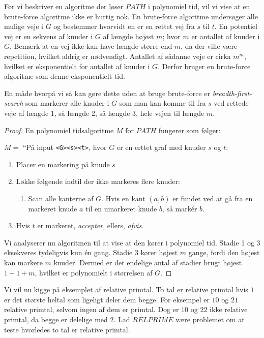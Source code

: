 Før vi beskriver en algoritme der løser $PATH$ i polynomiel tid, vil vi vise at en brute-force algoritme ikke er hurtig nok. En brute-force algoritme undersøger alle mulige veje i $G$ og bestemmer hvorvidt en er en rettet vej fra $s$ til $t$. En potentiel vej er en sekvens af knuder i $G$ af længde højest $m$; hvor $m$ er antallet af knuder i $G$. Bemærk at en vej ikke kan have længde større end $m$, da der ville være repetition, hvilket aldrig er nødvendigt. Antallet af sådanne veje er cirka $m^{m}$, hvilket er eksponentielt for antallet af knuder i $G$. Derfor bruger en brute-force algoritme som denne eksponentielt tid.

En måde hvorpå vi så kan gøre dette uden at bruge brute-force er \textit{breadth-first-search} som markerer alle knuder i $G$ som man kan komme til fra $s$ ved rettede veje af længde 1, så længde 2, så længde 3, hele vejen til længde $m$.

\begin{proof}
	En polynomiel tidsalgoritme $M$ for $PATH$ fungerer som følger:

	$M =$ ``På input \texttt{<G><s><t>}, hvor $G$ er en erttet graf med knuder $s$ og $t$:
	\begin{enumerate}
		\item Placer en markering på knude $s$
		\item Løkke følgende indtil der ikke markeres flere knuder:
		      \begin{enumerate}
			      \item Scan alle kanterne af $G$. Hvis en kant $(a,b)$ er fundet ved at gå fra en markeret knude $a$ til en umarkeret knude $b$, så markér $b$.
		      \end{enumerate}
		\item Hvis $t$ er markeret, \textit{accepter}, ellers, \textit{afvis}.
	\end{enumerate}

	Vi analyserer nu algoritmen til at vise at den kører i polynomiel tid. Stadie 1 og 3 eksekveres tydeligvis kun én gang. Stadie 3 kører højest $m$ gange, fordi den højest kan markere $m$ knuder. Dermed er det endelige antal af stadier brugt højest $1 + 1 + m$, hvilket er polynomielt i størrelsen af $G$.
\end{proof}

Vi vil nu kigge på eksemplet af relative primtal. To tal er relative primtal hvis $1$ er det største heltal som ligeligt deler dem begge. For eksempel er $10$ og $21$ relative primtal, selvom ingen af dem er primtal. Dog er $10$ og $22$ ikke relative primtal, da begge er delelige med $2$. Lad $RELPRIME$ være problemet om at teste hvorledes to tal er relative primtal.

